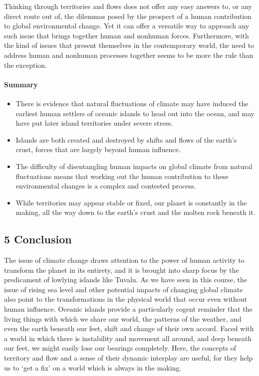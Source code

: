 \documentclass[letterpaper,10pt,english]{sphinxmanual}
\begin{document}
Thinking through territories and flows does not offer any easy answers to, or any direct route out of, the dilemmas posed by the prospect of a human contribution to global environmental change. Yet it can offer a versatile way to approach any such issue that brings together human and non\sphinxhyphen{}human forces. Furthermore, with the kind of issues that present themselves in the contemporary world, the need to address human and non\sphinxhyphen{}human processes together seems to be more the rule than the exception.


\paragraph{Summary}
\label{\detokenize{content/session_00/Part_00_04:Summary}}\begin{itemize}
\item {} 
There is evidence that natural fluctuations of climate may have induced the earliest human settlers of oceanic islands to head out into the ocean, and may have put later island territories under severe stress.

\item {} 
Islands are both created and destroyed by shifts and flows of the earth’s crust, forces that are largely beyond human influence.

\item {} 
The difficulty of disentangling human impacts on global climate from natural fluctuations means that working out the human contribution to these environmental changes is a complex and contested process.

\item {} 
While territories may appear stable or fixed, our planet is constantly in the making, all the way down to the earth’s crust and the molten rock beneath it.

\end{itemize}


\subsection{5 Conclusion}
\label{\detokenize{content/session_00/Part_00_05:5-Conclusion}}\label{\detokenize{content/session_00/Part_00_05::doc}}
The issue of climate change draws attention to the power of human activity to transform the planet in its entirety, and it is brought into sharp focus by the predicament of low\sphinxhyphen{}lying islands like Tuvalu. As we have seen in this course, the issue of rising sea level and other potential impacts of changing global climate also point to the transformations in the physical world that occur even without human influence. Oceanic islands provide a particularly cogent reminder that the living things with
which we share our world, the patterns of the weather, and even the earth beneath our feet, shift and change of their own accord. Faced with a world in which there is instability and movement all around, and deep beneath our feet, we might easily lose our bearings completely. Here, the concepts of territory and flow and a sense of their dynamic interplay are useful, for they help us to ‘get a fix’ on a world which is always in the making.
\end{document}
